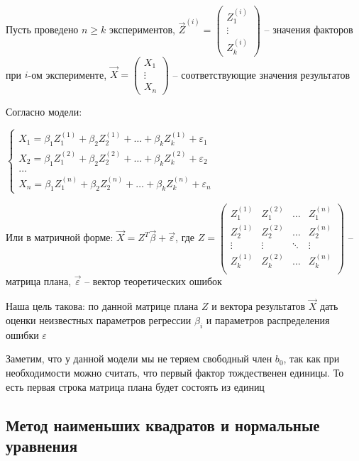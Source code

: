 Пусть проведено $n \geq k$ экспериментов, $\vec Z^{(i)} = \begin{pmatrix}Z_1^{(i)} \\ \vdots \\ Z_k^{(i)} \end{pmatrix}$ -- значения факторов при $i$-ом эксперименте,
$\vec X = \begin{pmatrix}X_1 \\ \vdots \\ X_n \end{pmatrix}$ -- соответствующие значения результатов

Согласно модели:

$\begin{cases}
    X_1 = \beta_1 Z_1^{(1)} + \beta_2 Z_2^{(1)} + \dots + \beta_k Z_k^{(1)} + \varepsilon_1 \\
    X_2 = \beta_1 Z_1^{(2)} + \beta_2 Z_2^{(2)} + \dots + \beta_k Z_k^{(2)} + \varepsilon_2 \\
    \dots \\
    X_n = \beta_1 Z_1^{(n)} + \beta_2 Z_2^{(n)} + \dots + \beta_k Z_k^{(n)} + \varepsilon_n
\end{cases}$

Или в матричной форме: $\vec X = Z^T \vec \beta + \vec \varepsilon$, 
где $Z = \begin{pmatrix}
    Z_1^{(1)} & Z_1^{(2)} & \dots & Z_1^{(n)} \\ 
    Z_2^{(1)} & Z_2^{(2)} & \dots & Z_2^{(n)} \\ 
    \vdots & \vdots & \ddots & \vdots \\
    Z_k^{(1)} & Z_k^{(2)} & \dots & Z_k^{(n)} \\ 
\end{pmatrix}$ -- матрица плана, $\vec \varepsilon$ -- вектор теоретических ошибок

Наша цель такова: по данной матрице плана $Z$ и вектора результатов $\vec X$ дать оценки неизвестных параметров регрессии $\beta_i$ 
и параметров распределения ошибки $\varepsilon$

\Nota Заметим, что у данной модели мы не теряем свободный член $b_0$, так как при необходимости можно считать, что первый фактор тождественен единицы. 
То есть первая строка матрица плана будет состоять из единиц

\subsection{Метод наименьших квадратов и нормальные уравнения}

